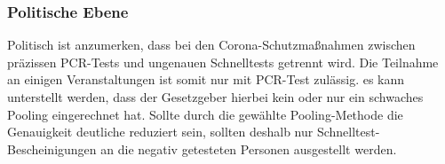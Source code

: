 \subsubsection{Politische Ebene}
Politisch ist anzumerken, dass bei den Corona-Schutzmaßnahmen zwischen präzissen PCR-Tests und ungenauen Schnelltests getrennt wird.
Die Teilnahme an einigen Veranstaltungen ist somit nur mit PCR-Test zulässig.
es kann unterstellt werden, dass der Gesetzgeber hierbei kein oder nur ein schwaches Pooling eingerechnet hat.
Sollte durch die gewählte Pooling-Methode die Genauigkeit deutliche reduziert sein, sollten deshalb nur Schnelltest-Bescheinigungen an die negativ getesteten Personen ausgestellt werden.

